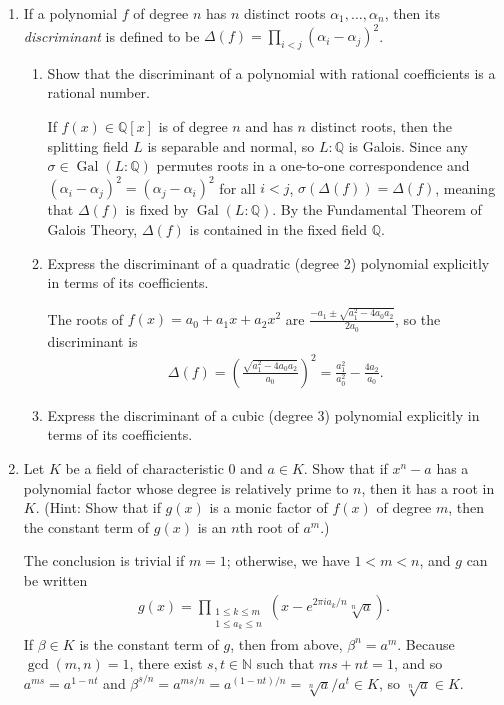 \documentclass[12pt]{article}
\newcommand{\QQ}{\mathbb{Q}}
\DeclareMathOperator{\Gal}{Gal}
\begin{document}
\begin{enumerate}
    \item If a polynomial $f$ of degree $n$ has $n$ distinct roots $\alpha_1,\dots,\alpha_n$, then its {\em discriminant} is defined to be $\Delta(f) = \displaystyle\prod_{i<j}(\alpha_i-\alpha_j)^2$. \par
    \begin{enumerate}
        \item Show that the discriminant of a polynomial with rational coefficients is a rational number. \par
            If $f(x) \in \QQ[x]$ is of degree $n$ and has $n$ distinct roots, then the splitting field $L$ is separable and normal, so $L : \QQ$ is Galois. Since any $\sigma \in \Gal(L : \QQ)$ permutes roots in a one-to-one correspondence and $(\alpha_i - \alpha_j)^2 = (\alpha_j - \alpha_i)^2$ for all $i < j$, $\sigma(\Delta(f)) = \Delta(f)$, meaning that $\Delta(f)$ is fixed by $\Gal(L : \QQ)$. By the Fundamental Theorem of Galois Theory, $\Delta(f)$ is contained in the fixed field $\QQ$.
        \item Express the discriminant of a quadratic (degree 2) polynomial explicitly in terms of its coefficients. \par
            The roots of $f(x) = a_0 + a_1 x + a_2 x^2$ are $\frac{-a_1 \pm \sqrt{a_1^2 - 4a_0 a_2}}{2a_0}$, so the discriminant is
            \begin{align*}
                \Delta(f) = \left( \frac{\sqrt{a_1^2 - 4a_0 a_2}}{a_0} \right)^2 = \frac{a_1^2}{a_0^2} - \frac{4a_2}{a_0}.
            \end{align*}
        \item Express the discriminant of a cubic (degree 3) polynomial explicitly in terms of its coefficients. \par
    \end{enumerate}

    \item Let $K$ be a field of characteristic $0$ and $a \in K$.  Show that if $x^n-a$ has a polynomial factor whose degree is relatively prime to $n$, then it has a root in $K$. (Hint: Show that if $g(x)$ is a monic factor of $f(x)$ of degree $m$, then the constant term of $g(x)$ is an $n$th root of $a^m$.) \par
        The conclusion is trivial if $m = 1$; otherwise, we have $1 < m < n$, and $g$ can be written
        \begin{align*}
            g(x) = \prod_{\substack{1 \leq k \leq m \\ 1 \leq a_k \leq n}} (x - e^{2\pi i a_k/n}\sqrt[n]{a}).
        \end{align*}
        If $\beta \in K$ is the constant term of $g$, then from above, $\beta^n = a^m$. Because $\gcd(m, n) = 1$, there exist $s, t \in \mathbb{N}$ such that $ms + nt = 1$, and so $a^{ms} = a^{1 - nt}$ and $\beta^{s/n} = a^{ms/n} = a^{(1 - nt)/n} = \sqrt[n]{a}/a^t \in K$, so $\sqrt[n]{a} \in K$.


\end{enumerate}
\end{document}
